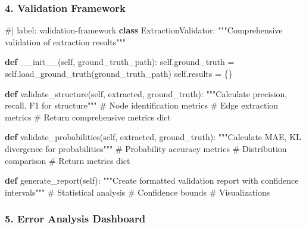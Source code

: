 \documentclass[
  11pt,
  letterpaper,
]{book}
\newenvironment{Shaded}{\begin{snugshade}}{\end{snugshade}}
\newcommand{\CommentTok}[1]{\textcolor[rgb]{0.37,0.37,0.37}{#1}}
\newcommand{\FunctionTok}[1]{\textcolor[rgb]{0.28,0.35,0.67}{#1}}
\newcommand{\KeywordTok}[1]{\textcolor[rgb]{0.00,0.23,0.31}{\textbf{#1}}}
\newcommand{\NormalTok}[1]{\textcolor[rgb]{0.00,0.23,0.31}{#1}}
\newcommand{\OperatorTok}[1]{\textcolor[rgb]{0.37,0.37,0.37}{#1}}
\newcommand{\VariableTok}[1]{\textcolor[rgb]{0.07,0.07,0.07}{#1}}
\begin{document}
\subsubsection{4. Validation Framework}\label{validation-framework}

\begin{Shaded}
\begin{Highlighting}[]
\CommentTok{\#| label: validation{-}framework}
\KeywordTok{class}\NormalTok{ ExtractionValidator:}
    \CommentTok{"""Comprehensive validation of extraction results"""}
    
    \KeywordTok{def} \FunctionTok{\_\_init\_\_}\NormalTok{(}\VariableTok{self}\NormalTok{, ground\_truth\_path):}
        \VariableTok{self}\NormalTok{.ground\_truth }\OperatorTok{=} \VariableTok{self}\NormalTok{.load\_ground\_truth(ground\_truth\_path)}
        \VariableTok{self}\NormalTok{.results }\OperatorTok{=}\NormalTok{ \{\}}
    
    \KeywordTok{def}\NormalTok{ validate\_structure(}\VariableTok{self}\NormalTok{, extracted, ground\_truth):}
        \CommentTok{"""Calculate precision, recall, F1 for structure"""}
        \CommentTok{\# Node identification metrics}
        \CommentTok{\# Edge extraction metrics}
        \CommentTok{\# Return comprehensive metrics dict}
        
    \KeywordTok{def}\NormalTok{ validate\_probabilities(}\VariableTok{self}\NormalTok{, extracted, ground\_truth):}
        \CommentTok{"""Calculate MAE, KL divergence for probabilities"""}
        \CommentTok{\# Probability accuracy metrics}
        \CommentTok{\# Distribution comparison}
        \CommentTok{\# Return metrics dict}
        
    \KeywordTok{def}\NormalTok{ generate\_report(}\VariableTok{self}\NormalTok{):}
        \CommentTok{"""Create formatted validation report with confidence intervals"""}
        \CommentTok{\# Statistical analysis}
        \CommentTok{\# Confidence bounds}
        \CommentTok{\# Visualizations}
\end{Highlighting}
\end{Shaded}

\subsubsection{5. Error Analysis
Dashboard}\label{error-analysis-dashboard}
\end{document}
